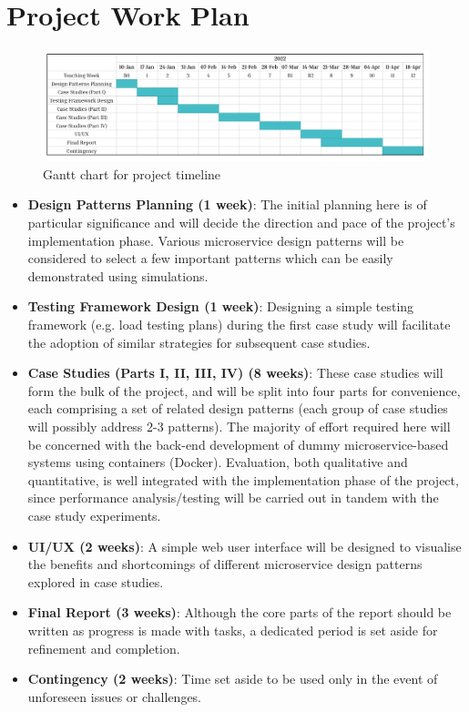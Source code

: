 \section{Project Work Plan}

\begin{figure}[H]
  \centering
  \includegraphics[width=0.85\linewidth]{./assets/images/work-plan-gantt.pdf}
  \caption{Gantt chart for project timeline}
  \label{fig:work-plan-gantt}
\end{figure}

\begin{itemize}
  \item \textbf{Design Patterns Planning (1 week)}: The initial planning here is of particular significance and will decide the direction and pace of the project's implementation phase. Various microservice design patterns will be considered to select a few important patterns which can be easily demonstrated using simulations.

  \item \textbf{Testing Framework Design (1 week)}: Designing a simple testing framework (e.g. load testing plans) during the first case study will facilitate the adoption of similar strategies for subsequent case studies.

  \item \textbf{Case Studies (Parts I, II, III, IV) (8 weeks)}: These case studies will form the bulk of the project, and will be split into four parts for convenience, each comprising a set of related design patterns (each group of case studies will possibly address 2-3 patterns). The majority of effort required here will be concerned with the back-end development of dummy microservice-based systems using containers (Docker). Evaluation, both qualitative and quantitative, is well integrated with the implementation phase of the project, since performance analysis/testing will be carried out in tandem with the case study experiments.

  \item \textbf{UI/UX (2 weeks)}: A simple web user interface will be designed to visualise the benefits and shortcomings of different microservice design patterns explored in case studies.

  \item \textbf{Final Report (3 weeks)}: Although the core parts of the report should be written as progress is made with tasks, a dedicated period is set aside for refinement and completion.
      
  \item \textbf{Contingency (2 weeks)}: Time set aside to be used only in the event of unforeseen issues or challenges.
\end{itemize}

